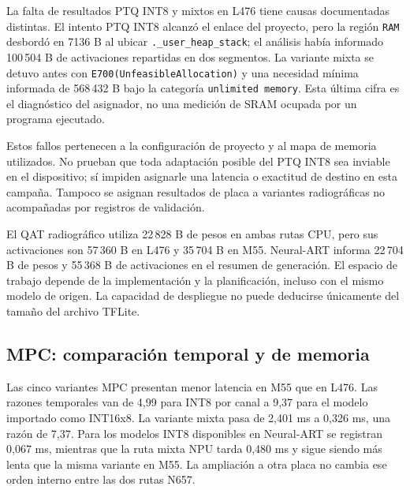La falta de resultados PTQ INT8 y mixtos en L476 tiene causas documentadas distintas. El intento PTQ INT8 alcanzó el enlace del proyecto, pero la región \texttt{RAM} desbordó en 7136 B al ubicar \texttt{.\_\allowbreak user\_\allowbreak heap\_\allowbreak stack}; el análisis había informado 100\,504 B de activaciones repartidas en dos segmentos. La variante mixta se detuvo antes con \texttt{E700(UnfeasibleAllocation)} y una necesidad mínima informada de 568\,432 B bajo la categoría \texttt{unlimited memory}. Esta última cifra es el diagnóstico del asignador, no una medición de SRAM ocupada por un programa ejecutado.

Estos fallos pertenecen a la configuración de proyecto y al mapa de memoria utilizados. No prueban que toda adaptación posible del PTQ INT8 sea inviable en el dispositivo; sí impiden asignarle una latencia o exactitud de destino en esta campaña. Tampoco se asignan resultados de placa a variantes radiográficas no acompañadas por registros de validación.


El QAT radiográfico utiliza 22\,828 B de pesos en ambas rutas CPU, pero sus activaciones son 57\,360 B en L476 y 35\,704 B en M55. Neural-ART informa 22\,704 B de pesos y 55\,368 B de activaciones en el resumen de generación. El espacio de trabajo depende de la implementación y la planificación, incluso con el mismo modelo de origen. La capacidad de despliegue no puede deducirse únicamente del tamaño del archivo TFLite.

\subsection{MPC: comparación temporal y de memoria}


Las cinco variantes MPC presentan menor latencia en M55 que en L476. Las razones temporales van de 4,99 para INT8 por canal a 9,37 para el modelo importado como INT16x8. La variante mixta pasa de 2,401 ms a 0,326 ms, una razón de 7,37. Para los modelos INT8 disponibles en Neural-ART se registran 0,067 ms, mientras que la ruta mixta NPU tarda 0,480 ms y sigue siendo más lenta que la misma variante en M55. La ampliación a otra placa no cambia ese orden interno entre las dos rutas N657.

